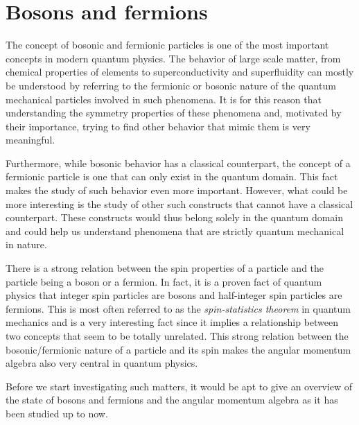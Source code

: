\section{Bosons and fermions}
The concept of bosonic and fermionic particles is one of the most important concepts
in modern quantum physics. The behavior of large scale matter, from chemical
properties of elements to superconductivity and superfluidity can mostly be
understood by referring to the fermionic or bosonic nature of the quantum
mechanical particles involved in such phenomena. It is for this reason that
understanding the symmetry properties of these phenomena and, motivated by their
importance, trying to find other behavior that mimic them is very meaningful.


Furthermore, while bosonic behavior has a classical counterpart, the
concept of a fermionic particle is one that can only exist in the quantum
domain. This fact makes the study of such behavior even more important.
However, what could be more interesting is the study of other such
constructs that cannot have a classical counterpart. These constructs would
thus belong solely in the quantum domain and could help us understand phenomena
that are strictly quantum mechanical in nature.


There is a strong relation between the spin properties of a particle and
the particle being a boson or a fermion. In fact, it is a proven fact of
quantum physics that integer spin particles are bosons and half-integer spin
particles are fermions. This is most often referred to as the {\it spin-statistics
theorem} in quantum mechanics and is a very interesting fact since it implies
a relationship between two concepts that seem to be totally unrelated. This
strong relation between the bosonic/fermionic nature of a particle and its spin
makes the angular momentum algebra also very central in quantum physics.


Before we start investigating such matters, it would be apt to give an
overview of the state of bosons and fermions and the angular momentum
algebra as it has been studied up to now.


